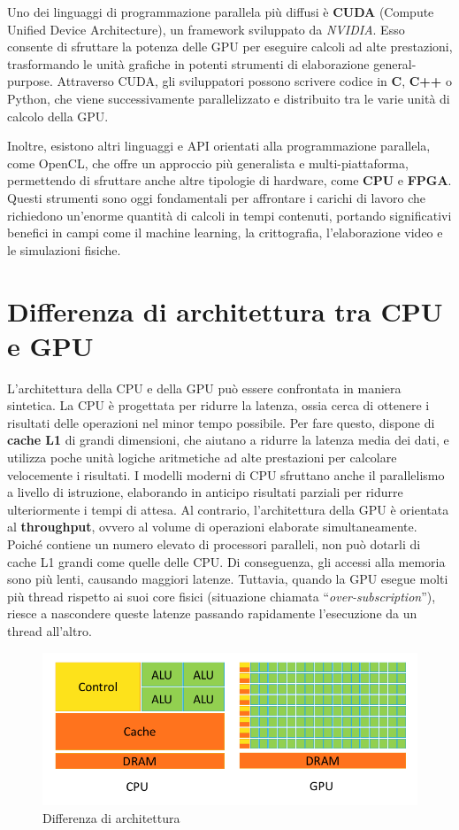 \documentclass[12pt,a4paper]{report}
\begin{document}
Uno dei linguaggi di programmazione parallela più diffusi è \textbf{CUDA} (Compute Unified Device Architecture), un framework sviluppato da \textit{NVIDIA}.    Esso consente di sfruttare la potenza delle GPU per eseguire calcoli ad alte prestazioni, trasformando le unità grafiche in potenti strumenti di elaborazione general-purpose. Attraverso CUDA, gli sviluppatori possono scrivere codice in \textbf{C}, \textbf{C++} o Python, che viene successivamente parallelizzato e distribuito tra le varie unità di calcolo della GPU.

Inoltre, esistono altri linguaggi e API orientati alla programmazione parallela, come OpenCL, che offre un approccio più generalista e multi-piattaforma, permettendo di sfruttare anche altre tipologie di hardware, come \textbf{CPU} e \textbf{FPGA}. Questi strumenti sono oggi fondamentali per affrontare i carichi di lavoro che richiedono un’enorme quantità di calcoli in tempi contenuti, portando significativi benefici in campi come il machine learning, la crittografia, l’elaborazione video e le simulazioni fisiche.

\section{Differenza di architettura tra CPU e GPU}

L'architettura della CPU e della GPU può essere confrontata in maniera sintetica. La CPU è progettata per ridurre la latenza, ossia cerca di ottenere i risultati delle operazioni nel minor tempo possibile. Per fare questo, dispone di \textbf{cache L1} di grandi dimensioni, che aiutano a ridurre la latenza media dei dati, e utilizza poche unità logiche aritmetiche ad alte prestazioni per calcolare velocemente i risultati. I modelli moderni di CPU sfruttano anche il parallelismo a livello di istruzione, elaborando in anticipo risultati parziali per ridurre ulteriormente i tempi di attesa. Al contrario, l'architettura della GPU è orientata al \textbf{throughput}, ovvero al volume di operazioni elaborate simultaneamente. Poiché contiene un numero elevato di processori paralleli, non può dotarli di cache L1 grandi come quelle delle CPU. Di conseguenza, gli accessi alla memoria sono più lenti, causando maggiori latenze. Tuttavia, quando la GPU esegue molti più thread rispetto ai suoi core fisici (situazione chiamata “\textit{over-subscription}”), riesce a nascondere queste latenze passando rapidamente l'esecuzione da un thread all'altro.


\begin{figure}[h]
    \includegraphics[width=1\linewidth]{img/CPUvsGPU.png}
    \caption{Differenza di architettura \cite{CUDAtutorial}}
\end{figure}
\end{document}
